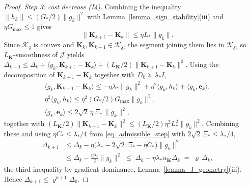 \documentclass[letterpaper, 10 pt, conference]{ieeeconf}
\newcommand{\be}{\mathbf{e}}
\newcommand{\bK}{\mathbf{K}}
\newcommand{\cJ}{\mathcal{J}}
\newcommand{\cK}{\mathcal{K}}
\newcommand{\Lemm}{Lemma}
\begin{document}
\begin{proof}
    \emph{Step 3: cost decrease \textup{(I4)}.} Combining  the inequality $\|h_k\|\le(G_{\ast}/2)\|g_k\|^{2}$ with \Lemm~\ref{lemma_sign_stability}(iii) and $\eta G_{\max}\le1$ gives
    \begin{equation}\label{eq_gain_step_bound}
        \|\bK_{k+1}-\bK_k\|\le\eta L_{\ast}\|g_k\|.
    \end{equation}
    Since $\cK_{\overline{\delta}}$ is convex and $\bK_{k}, \bK_{k+1} \in \cK_{\overline{\delta}}$, the segment joining them lies in $\cK_{\overline{\delta}}$, so $L_{\bK}$-smoothness of $\cJ$ yields $\Delta_{k+1} \le \Delta_{k} + \langle g_{k}, \bK_{k+1} - \bK_{k}\rangle + ({L_{\bK}}/{2}) \|\bK_{k+1} - \bK_{k}\|^2$. Using the decomposition of $\bK_{k+1} - \bK_{k}$ together with $D_{k} \succeq \lambda_{\ast} I$,
    \begin{equation}
        \begin{gathered}
            \langle g_{k}, \bK_{k+1} {-} \bK_{k}\rangle
            \le
            -\eta \lambda_{\ast}\|g_{k}\|^{2} + \eta^{2} \langle g_{k}, h_{k}\rangle + \langle g_{k}, \be_{k}\rangle,
            \\
            \eta^{2} \langle g_{k}, h_{k}\rangle
            \le
            \eta^{2} ({G_{\ast}}/{2}) G_{\max} \|g_{k}\|^{2},
            \\
            \langle g_{k}, \be_{k}\rangle
            \le
            2 \sqrt{2}\, \eta\, \Xi_{\ast}\, \|g_k\|^{2},
        \end{gathered}
    \end{equation}
    together with $({L_{\bK}}/{2})\|\bK_{k+1}-\bK_k\|^{2} \le ({L_{\bK}}/{2}) \eta^{2} L_{\ast}^{2} \|g_{k}\|^2$. Combining these and using $\eta C_{\ast} \le \lambda_{\ast}/4$ from \eqref{eq_admissible_step} with $2\sqrt{2}\,\Xi_{\ast} \le \lambda_{\ast}/4$,
    \begin{equation} \label{eq_descent_chain}
        \begin{aligned}
        \Delta_{k+1}
        &\le \Delta_{k} - \eta\bigl(\lambda_{\ast} - 2\sqrt{2}\,\Xi_{\ast} - \eta C_{\ast}\bigr)\|g_{k}\|^{2}
        \\
        &\le \Delta_{k} - \tfrac{\eta\lambda_{\ast}}{2}\|g_{k}\|^{2}
        \;\le\; \Delta_{k} - \eta\lambda_{\ast}\alpha_{\bK}\Delta_{k}
        \;=\; \varrho\,\Delta_{k},
        \end{aligned}
    \end{equation}
    the third inequality by gradient dominance, \Lemm~\ref{lemma_J_geometry}(iii). Hence $\Delta_{k+1} \le \varrho^{k+1}\Delta_{0}$.


\end{proof}
\end{document}
